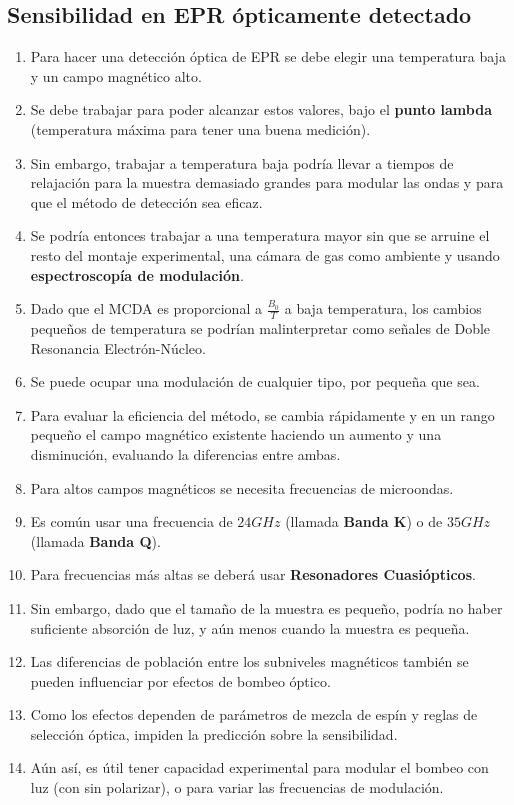 \documentclass[aps,rmp,reprint,longbibliography]{revtex4-1}
\begin{document}
\subsection{Sensibilidad en EPR ópticamente detectado}
\begin{enumerate}
\item Para hacer una detección óptica de EPR se debe elegir una temperatura baja y un campo magnético alto.
\item Se debe trabajar para poder alcanzar estos valores, bajo el \textbf{punto lambda} (temperatura máxima para tener una buena medición). 
\item Sin embargo, trabajar a temperatura baja podría llevar a tiempos de relajación para la muestra demasiado grandes para modular las ondas  y para que el método de detección sea eficaz. 
\item Se podría entonces trabajar a una temperatura mayor sin que se arruine el resto del montaje experimental, una cámara de gas como ambiente y usando \textbf{espectroscopía de modulación}.
\item Dado que el MCDA es proporcional a $\frac{B_0}{T}$ a baja temperatura, los cambios pequeños de temperatura se podrían malinterpretar como señales de Doble Resonancia Electrón-Núcleo. 
\item Se puede ocupar una modulación de cualquier tipo, por pequeña que sea. 
\item Para evaluar la eficiencia del método, se cambia rápidamente y en un rango pequeño el campo magnético existente haciendo un aumento y una disminución, evaluando la diferencias entre ambas.
\item Para altos campos magnéticos se necesita frecuencias de microondas. 
\item Es común usar una frecuencia de $24 GHz$ (llamada \textbf{Banda K}) o de $35 GHz$ (llamada \textbf{Banda Q}). 
\item Para frecuencias más altas se deberá usar \textbf{Resonadores Cuasiópticos}. 
\item Sin embargo, dado que el tamaño de la muestra es pequeño, podría no haber suficiente absorción de luz, y aún menos cuando la muestra es pequeña.
\item Las diferencias de población entre los subniveles magnéticos también se pueden influenciar por efectos de bombeo óptico. 
\item Como los efectos dependen de parámetros de mezcla de espín y reglas de selección óptica, impiden la predicción sobre la sensibilidad. 
\item Aún así, es útil tener capacidad experimental para modular el bombeo con luz (con sin polarizar), o para variar las frecuencias de modulación. 

\end{enumerate}
\end{document}
